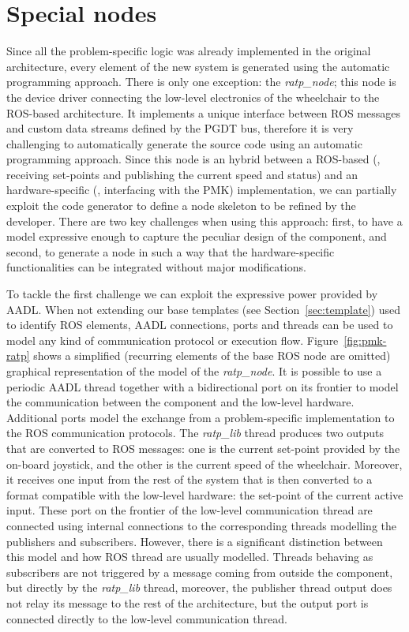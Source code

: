 \section{Special nodes}
\label{sec:special-node}
Since all the problem-specific logic was already implemented in the original architecture, every element of the new system is generated using the automatic programming approach. There is only one exception: the \textit{ratp\_node}; this node is the device driver connecting the low-level electronics of the wheelchair to the ROS-based architecture. It implements a unique interface between ROS messages and custom data streams defined by the PGDT bus, therefore it is very challenging to automatically generate the source code using an automatic programming approach. Since this node is an hybrid between a ROS-based (\ie, receiving set-points and publishing the current speed and status) and an hardware-specific (\ie, interfacing with the PMK) implementation, we can partially exploit the code generator to define a node skeleton to be refined by the developer. There are two key challenges when using this approach: first, to have a model expressive enough to capture the peculiar design of the component, and second, to generate a node in such a way that the hardware-specific functionalities can be integrated without major modifications.

To tackle the first challenge we can exploit the expressive power provided by AADL. When not extending our base templates (see Section~\ref{sec:template}) used to identify ROS elements,  AADL connections, ports and threads can be used to model any kind of communication protocol or execution flow. Figure~\ref{fig:pmk-ratp} shows a simplified (recurring elements of the base ROS node are omitted) graphical representation of the model of the \textit{ratp\_node}. It is possible to use a periodic AADL thread together with a bidirectional port on its frontier to model the communication between the component and the low-level hardware. Additional ports model the exchange from a problem-specific implementation to the ROS communication protocols.  The \textit{ratp\_lib} thread produces two outputs that are converted to ROS messages: one is the current set-point provided by the on-board joystick, and the other is the current speed of the wheelchair. Moreover, it receives one input from the rest of the system that is then converted to a format compatible with the low-level hardware: the set-point of the current active input. These port on the frontier of the low-level communication thread are connected using internal connections to the corresponding threads modelling the publishers and subscribers. However, there is a significant distinction between this model and how ROS thread are usually modelled. Threads behaving as subscribers are not triggered by a message coming from outside the component, but directly by the \textit{ratp\_lib} thread, moreover, the publisher thread output does not relay its message to the rest of the architecture, but the output port is connected directly to the low-level communication thread.

